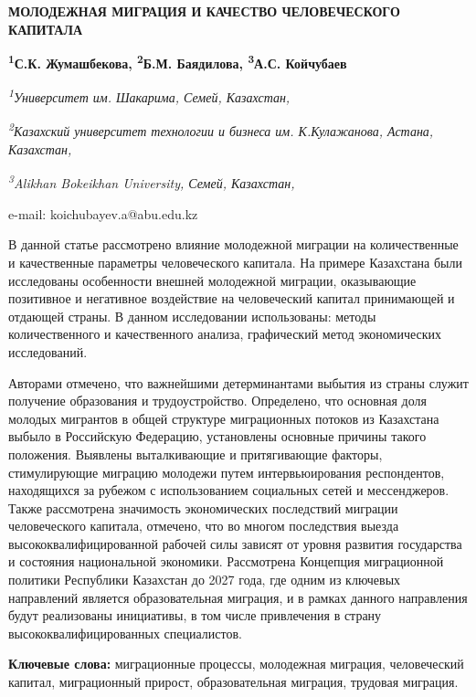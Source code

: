 \begin{articleheader}
{\bfseries МОЛОДЕЖНАЯ МИГРАЦИЯ И КАЧЕСТВО ЧЕЛОВЕЧЕСКОГО КАПИТАЛА}

{\bfseries
\textsuperscript{1}С.К. Жумашбекова,
\textsuperscript{2}Б.М. Баядилова,
\textsuperscript{3}А.С. Койчубаев\textsuperscript{\envelope }}
\end{articleheader}

\begin{affiliation}
\emph{\textsuperscript{1}Университет им. Шакарима, Семей, Казахстан,}

\emph{\textsuperscript{2}Казахский университет технологии и бизнеса им. К.Кулажанова, Астана, Казахстан,}

\emph{\textsuperscript{3}Alikhan Bokeikhan University, Семей, Казахстан,}

e-mail: koichubayev.a@abu.edu.kz
\end{affiliation}

В данной статье рассмотрено влияние молодежной миграции на
количественные и качественные параметры человеческого капитала. На
примере Казахстана были исследованы особенности внешней молодежной
миграции, оказывающие позитивное и негативное воздействие на
человеческий капитал принимающей и отдающей страны. В данном
исследовании использованы: методы количественного и качественного
анализа, графический метод экономических исследований.

Авторами отмечено, что важнейшими детерминантами выбытия из страны
служит получение образования и трудоустройство. Определено, что основная
доля молодых мигрантов в общей структуре миграционных потоков из
Казахстана выбыло в Российскую Федерацию, установлены основные причины
такого положения. Выявлены выталкивающие и притягивающие факторы,
стимулирующие миграцию молодежи путем интервьюирования респондентов,
находящихся за рубежом с использованием социальных сетей и мессенджеров.
Также рассмотрена значимость экономических последствий миграции
человеческого капитала, отмечено, что во многом последствия выезда
высококвалифицированной рабочей силы зависят от уровня развития
государства и состояния национальной экономики. Рассмотрена Концепция
миграционной политики Республики Казахстан до 2027 года, где одним из
ключевых направлений является образовательная миграция, и в рамках
данного направления будут реализованы инициативы, в том числе
привлечения в страну высококвалифицированных специалистов.

{\bfseries Ключевые слова:} миграционные процессы, молодежная миграция,
человеческий капитал, миграционный прирост, образовательная миграция,
трудовая миграция.


